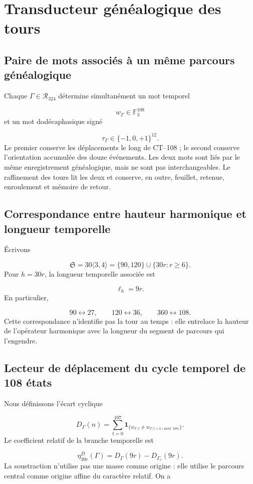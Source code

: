 \section{Transducteur généalogique des tours}
\subsection{Paire de mots associés à un même parcours généalogique}
Chaque \(\Gamma\in\mathcal R_{324}\) détermine simultanément un mot temporel

\[
 w_\Gamma\in\mathbb F_3^{108}
\]
et un mot dodécaphasique signé

\[
 \tau_\Gamma\in\{-1,0,+1\}^{12}.
\]
Le premier conserve les déplacements le long de CT--108 ; le second conserve l'orientation accumulée des douze événements. Les deux mots sont liés par le même enregistrement généalogique, mais ne sont pas interchangeables. Le raffinement des tours lit les deux et conserve, en outre, feuillet, retenue, enroulement et mémoire de retour.

\subsection{Correspondance entre hauteur harmonique et longueur temporelle}
Écrivons

\[
 \mathfrak S=30\langle3,4\rangle
 =\{90,120\}\cup\{30r:r\ge6\}.
\]
Pour \(h=30r\), la longueur temporelle associée est

\[
 \ell_h=9r.
\]
En particulier,

\[
 90\longleftrightarrow27,\qquad
 120\longleftrightarrow36,\qquad
 360\longleftrightarrow108.
\]
Cette correspondance n'identifie pas la tour au temps : elle entrelace la hauteur de l'opérateur harmonique avec la longueur du segment de parcours qui l'engendre.

\subsection{Lecteur de déplacement du cycle temporel de 108 états}
Nous définissons l'écart cyclique

\[
 D_\Gamma(n)=
 \sum_{t=0}^{107}
 \mathbf1_{\{w_{\Gamma,t}\ne
 w_{\Gamma,t+n\!\!\!\pmod{108}}\}}.
\]
Le coefficient relatif de la branche temporelle est

\[
 \boxed{\eta_{30r}^{D}(\Gamma)
 =D_\Gamma(9r)-D_{\Gamma_e}(9r).}
\]
La soustraction n'utilise pas une masse comme origine : elle utilise le parcours central comme origine affine du caractère relatif. On a

